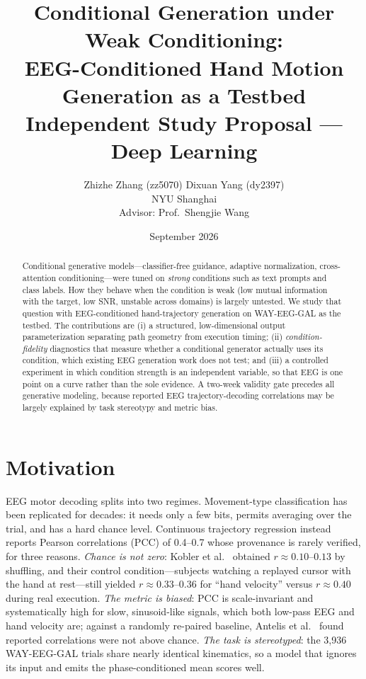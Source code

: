 \documentclass[11pt]{article}
\title{\textbf{Conditional Generation under Weak Conditioning:\\[2pt]
EEG-Conditioned Hand Motion Generation as a Testbed}\\[6pt]
\large Independent Study Proposal --- Deep Learning}
\author{Zhizhe Zhang (zz5070) \quad Dixuan Yang (dy2397)\\
NYU Shanghai \\[4pt]
\small Advisor: Prof.\ Shengjie Wang}
\date{September 2026}
\begin{document}
\maketitle
\vspace{-2em}

\begin{abstract}
\noindent Conditional generative models---classifier-free guidance, adaptive normalization, cross-attention conditioning---were tuned on \emph{strong} conditions such as text prompts and class labels. How they behave when the condition is weak (low mutual information with the target, low SNR, unstable across domains) is largely untested. We study that question with EEG-conditioned hand-trajectory generation on WAY-EEG-GAL as the testbed. The contributions are (i) a structured, low-dimensional output parameterization separating path geometry from execution timing; (ii) \emph{condition-fidelity} diagnostics that measure whether a conditional generator actually uses its condition, which existing EEG generation work does not test; and (iii) a controlled experiment in which condition strength is an independent variable, so that EEG is one point on a curve rather than the sole evidence. A two-week validity gate precedes all generative modeling, because reported EEG trajectory-decoding correlations may be largely explained by task stereotypy and metric bias.
\end{abstract}

\section{Motivation}

EEG motor decoding splits into two regimes. Movement-type classification has been replicated for decades: it needs only a few bits, permits averaging over the trial, and has a hard chance level. Continuous trajectory regression instead reports Pearson correlations (PCC) of 0.4--0.7 whose provenance is rarely verified, for three reasons. \emph{Chance is not zero}: Kobler et al.~\cite{kobler2018} obtained $r\approx0.10$--$0.13$ by shuffling, and their control condition---subjects watching a replayed cursor with the hand at rest---still yielded $r\approx0.33$--$0.36$ for ``hand velocity'' versus $r\approx0.40$ during real execution. \emph{The metric is biased}: PCC is scale-invariant and systematically high for slow, sinusoid-like signals, which both low-pass EEG and hand velocity are; against a randomly re-paired baseline, Antelis et al.~\cite{antelis2013} found reported correlations were not above chance. \emph{The task is stereotyped}: the 3{,}936 WAY-EEG-GAL trials share nearly identical kinematics, so a model that ignores its input and emits the phase-conditioned mean scores well.
\end{document}
